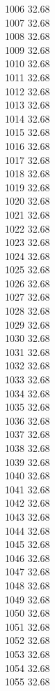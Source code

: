 1006	32.68\\
1007	32.68\\
1008	32.68\\
1009	32.68\\
1010	32.68\\
1011	32.68\\
1012	32.68\\
1013	32.68\\
1014	32.68\\
1015	32.68\\
1016	32.68\\
1017	32.68\\
1018	32.68\\
1019	32.68\\
1020	32.68\\
1021	32.68\\
1022	32.68\\
1023	32.68\\
1024	32.68\\
1025	32.68\\
1026	32.68\\
1027	32.68\\
1028	32.68\\
1029	32.68\\
1030	32.68\\
1031	32.68\\
1032	32.68\\
1033	32.68\\
1034	32.68\\
1035	32.68\\
1036	32.68\\
1037	32.68\\
1038	32.68\\
1039	32.68\\
1040	32.68\\
1041	32.68\\
1042	32.68\\
1043	32.68\\
1044	32.68\\
1045	32.68\\
1046	32.68\\
1047	32.68\\
1048	32.68\\
1049	32.68\\
1050	32.68\\
1051	32.68\\
1052	32.68\\
1053	32.68\\
1054	32.68\\
1055	32.68\\
